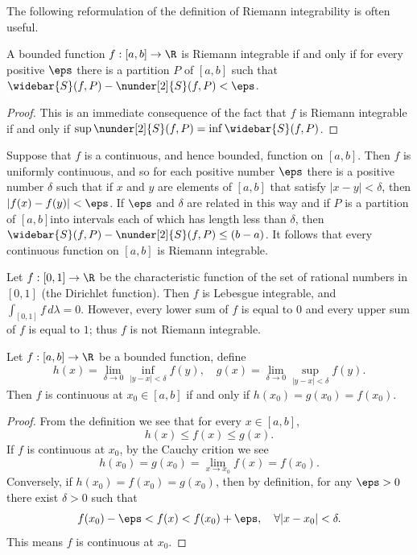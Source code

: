 The following reformulation of the definition of Riemann integrability is often useful.
\begin{lemma}\label{Riemann integrable iff up-low<eps}
A bounded function $f:[a,b]\to\R$ is Riemann integrable if and only if for every positive $\eps$ there is a partition $P$ of $[a,b]$ such that $\widebar{S}(f,P)-\nunder[2]{S}(f,P)<\eps$.
\end{lemma}
\begin{proof}
This is an immediate consequence of the fact that $f$ is Riemann integrable if and only if $\sup\nunder[2]{S}(f,P)=\inf\widebar{S}(f,P)$.
\end{proof}
\begin{example}
Suppose that $f$ is a continuous, and hence bounded, function on $[a,b]$. Then $f$ is uniformly continuous, and so for each positive number $\eps$ there is a positive number $\delta$ such that if $x$ and $y$ are elements of $[a,b]$ that satisfy $|x−y|<\delta$, then $|f(x)-f(y)|<\eps$. If $\eps$ and $\delta$ are related in this way and if $P$ is a partition of $[a,b] $into intervals each of which has length less than $\delta$, then $\widebar{S}(f,P)-\nunder[2]{S}(f,P)\leq(b-a)$. It follows that every continuous function on $[a,b]$ is Riemann integrable.
\end{example}
\begin{example}
Let $f:[0,1]\to\R$ be the characteristic function of the set of rational
numbers in $[0,1]$ (the Dirichlet function). Then $f$ is Lebesgue integrable, and $\int_{[0,1]}f\,d\lambda=0$. However, every lower sum of $f$ is equal to $0$ and every upper sum of $f$ is equal to $1$; thus $f$ is not Riemann integrable.
\end{example}
\begin{lemma}\label{Riemann integrable lemma}
Let $f:[a,b]\to\R$ be a bounded function, define
\[h(x)=\lim_{\delta\to 0}\inf_{|y-x|<\delta}f(y),\quad g(x)=\lim_{\delta\to 0}\sup_{|y-x|<\delta}f(y).\]
Then $f$ is continuous at $x_0\in[a,b]$ if and only if $h(x_0)=g(x_0)=f(x_0)$.
\end{lemma}
\begin{proof}
From the definition we see that for every $x\in[a,b]$,
\[h(x)\leq f(x)\leq g(x).\]
If $f$ is continuous at $x_0$, by the Cauchy crition we see 
\[h(x_0)=g(x_0)=\lim_{x\to x_0}f(x)=f(x_0).\]
Conversely, if $h(x_0)=f(x_0)=g(x_0)$, then by definition, for any $\eps>0$ there exist $\delta>0$ such that
\[f(x_0)-\eps<f(x)<f(x_0)+\eps,\quad\forall|x-x_0|<\delta.\]
This means $f$ is continuous at $x_0$.
\end{proof}
